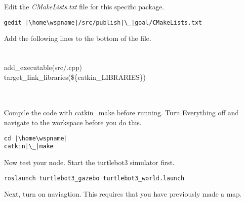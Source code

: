 \documentclass[12pt]{article}
\begin{document}
\begin{description}[labelindent=1cm]
    \newpage
    
    \item Edit the {\it CMakeLists.txt} file for this specific package. \\
\begin{verbatim}
gedit |\home\wspname|/src/publish|\_|goal/CMakeLists.txt
\end{verbatim}

\vspace{5mm}Add the following lines to the bottom of the file. \\
\underline{\hspace{155mm}}\\\\
{\selectfont add\_executable(\nodname\hspace{3mm}src/\nodname.cpp) } \\
{\selectfont target\_link\_libraries(\nodname \hspace{3mm}\$\{catkin\_LIBRARIES\}) } \vspace{2mm}\\
\underline{\hspace{155mm}}\\\\


\item Compile the code with catkin\_make before running. Turn Everything off and navigate to the workspace before you do this.\\
\begin{verbatim}
cd |\home\wspname|
catkin|\_|make
\end{verbatim}

\item Now test your node. Start the turtlebot3 simulator first. 
 
\begin{verbatim}
roslaunch turtlebot3_gazebo turtlebot3_world.launch
\end{verbatim}

\item Next, turn on naviagtion. This requires that you have previously made a map.
 

\end{description}
\end{document}

